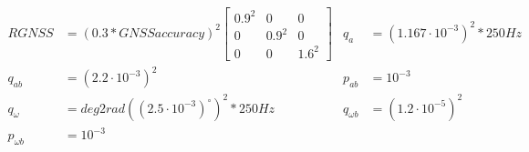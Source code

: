 \begin{align}
        RGNSS &= (0.3 * GNSSaccuracy)^2\begin{bmatrix}
    0.9^2 & 0 & 0 \\
    0 & 0.9^2 & 0 \\
    0 & 0 & 1.6^2
\end{bmatrix} & q_a &= (1.167 \cdot 10^{-3})^2 * 250Hz \label{eq:eskf-sim-tuning1} \\
        q_{ab} &= (2.2 \cdot 10^{-3})^2 & p_{ab} &= 10^{-3} \label{eq:eskf-sim-tuning2} \\
        q_\omega &= deg2rad((2.5 \cdot 10^{-3})^\circ)^2 * 250Hz  & q_{\omega b} &= (1.2 \cdot 10^{-5})^2 \label{eq:eskf-sim-tuning3} \\
        p_{\omega b} &= 10^{-3} \label{eq:eskf-sim-tuning4}
\end{align}

